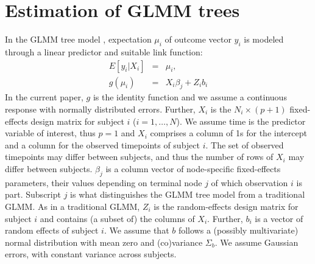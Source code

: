 \documentclass[doc,floatsintext,natbib]{apa7}
\begin{document}





\section{Estimation of GLMM trees}

In the GLMM tree model \citep{FokkySmit18}, expectation $\mu_i$ of outcome vector $y_i$ is modeled through a linear predictor and suitable link function:
%
\begin{eqnarray}
\label{eq:expected_value}
E[y_i | X_i] & = & \mu_i, \\
\label{eq:GLMMtree}
g(\mu_{i}) & = & X_{i} \beta_{j} + Z_{i} b_{i}
\end{eqnarray}
%
In the current paper, $g$ is the identity function and we assume a continuous response with normally distributed errors. Further, $X_i$ is the $N_i \times (p+1)$ fixed-effects design matrix for subject $i$ ($i = {1, \dots, N}$). We assume time is the predictor variable of interest, thus $p=1$ and $X_i$ comprises a column of 1s for the intercept and a column for the observed timepoints of subject $i$. The set of observed timepoints may differ between subjects, and thus the number of rows of $X_i$ may differ between subjects. $\beta_j$ is a column vector of node-specific fixed-effects parameters, their values depending on terminal node $j$ of which observation $i$ is part. Subscript $j$ is what distinguishes the GLMM tree model from a traditional GLMM. As in a traditional GLMM, $Z_i$ is the random-effects design matrix for subject $i$ and contains (a subset of) the columns of $X_i$. Further, $b_i$ is a vector of random effects of subject $i$. We assume that $b$ follows a (possibly multivariate) normal distribution with mean zero and (co)variance $\Sigma_{b}$. We assume Gaussian errors, with constant variance across subjects. 
\end{document}
